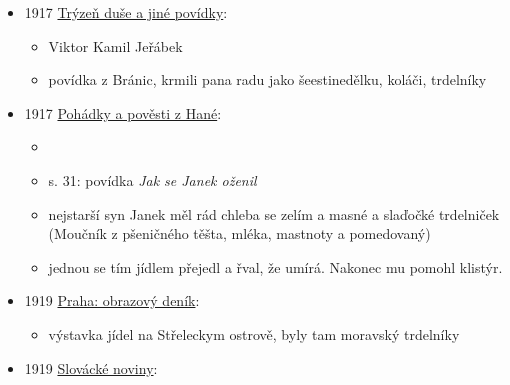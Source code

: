 \begin{itemize}
\begin{itemize}
    \begin{itemize}
    \tightlist
    \item
      na Brněnsku je jádrem masopustních zvyků ostatkové právo, soubor
      žertů, šprýmů a zábav
    \item
      taky mají odznak, co se nazývá ostatovké právo, který dávají přes
      noc k některý z nejoblíbenějších děvčat, ta je pohostí koblihama,
      sněhovýma koulema, božíma milostma a smaženýma trdelníkama
    \end{itemize}
  \end{itemize}
\item
  1917
  \href{https://ceskadigitalniknihovna.cz/view/uuid:bc7a2eb0-944f-11e6-baa5-005056827e51?page=uuid\%3A1fdf0630-a5f1-11e6-8bf1-001018b5eb5c&fulltext=trdeln\%C3\%ADk\%20OR\%20trdeln\%C3\%ADky\%20OR\%20trdeln\%C3\%ADk\%C5\%AF&source=mzk}{Trýzeň
  duše a jiné povídky}:

  \begin{itemize}
  \tightlist
  \item
    Viktor Kamil Jeřábek
  \item
    povídka z Bránic, krmili pana radu jako šeestinedělku, koláči,
    trdelníky
  \end{itemize}
\item
  1917
  \href{https://www.digitalniknihovna.cz/vkol/uuid/uuid:51d8b7c0-bcda-4673-b2bd-680700ded3fa}{Pohádky
  a pověsti z Hané}:

  \begin{itemize}
  \tightlist
  \item
  \item
    s. 31: povídka \emph{Jak se Janek oženil}
  \item
    nejstarší syn Janek měl rád chleba se zelím a masné a slaďočké
    trdelniček (Moučník z pšeničného těšta, mléka, mastnoty a
    pomedovaný)
  \item
    jednou se tím jídlem přejedl a řval, že umírá. Nakonec mu pomohl
    klistýr.
  \end{itemize}
\item
  1919
  \href{https://ceskadigitalniknihovna.cz/view/uuid:14e7b8a0-0fe2-11ee-8c4d-5ef3fc9bb22f?page=uuid\%3A9b6bf140-0ff9-11ee-b46c-5ef3fcdaa9a7&fulltext=trdeln\%C3\%ADk\%20OR\%20trdeln\%C3\%ADky\%20OR\%20trdeln\%C3\%ADk\%C5\%AF&source=nkp}{Praha:
  obrazový deník}:

  \begin{itemize}
  \tightlist
  \item
    výstavka jídel na Střeleckym ostrově, byly tam moravský trdelníky
  \end{itemize}
\item
  1919
  \href{https://www.digitalniknihovna.cz/vkol/uuid/uuid:d6f5107d-923f-4194-b51c-555443d0e334}{Slovácké
  noviny}:


\end{itemize}

